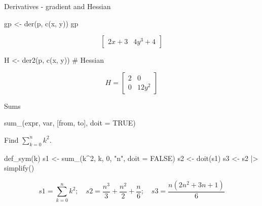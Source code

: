 \documentclass[
  ignorenonframetext,
]{beamer}
\newenvironment{Shaded}{\begin{snugshade}}{\end{snugshade}}
\newcommand{\AttributeTok}[1]{\textcolor[rgb]{0.40,0.45,0.13}{#1}}
\newcommand{\CommentTok}[1]{\textcolor[rgb]{0.37,0.37,0.37}{#1}}
\newcommand{\ConstantTok}[1]{\textcolor[rgb]{0.56,0.35,0.01}{#1}}
\newcommand{\DecValTok}[1]{\textcolor[rgb]{0.68,0.00,0.00}{#1}}
\newcommand{\FunctionTok}[1]{\textcolor[rgb]{0.28,0.35,0.67}{#1}}
\newcommand{\NormalTok}[1]{\textcolor[rgb]{0.00,0.23,0.31}{#1}}
\newcommand{\OtherTok}[1]{\textcolor[rgb]{0.00,0.23,0.31}{#1}}
\newcommand{\SpecialCharTok}[1]{\textcolor[rgb]{0.37,0.37,0.37}{#1}}
\newcommand{\StringTok}[1]{\textcolor[rgb]{0.13,0.47,0.30}{#1}}
\begin{document}
\begin{frame}[fragile]{Derivatives - gradient and Hessian}
\protect\hypertarget{derivatives---gradient-and-hessian}{}
\begin{Shaded}
\begin{Highlighting}[]
\NormalTok{gp }\OtherTok{\textless{}{-}} \FunctionTok{der}\NormalTok{(p, }\FunctionTok{c}\NormalTok{(x, y))}
\NormalTok{gp}
\end{Highlighting}
\end{Shaded}

\[\left[\begin{matrix}2 x + 3 & 4 y^{3} + 4\end{matrix}\right]\]

\begin{Shaded}
\begin{Highlighting}[]
\NormalTok{H }\OtherTok{\textless{}{-}} \FunctionTok{der2}\NormalTok{(p, }\FunctionTok{c}\NormalTok{(x, y)) }\CommentTok{\# Hessian}
\end{Highlighting}
\end{Shaded}

\[
H = \left[\begin{matrix}2 & 0\\0 & 12 y^{2}\end{matrix}\right]
\]
\end{frame}

\begin{frame}[fragile]{Sums}
\protect\hypertarget{sums}{}
\begin{Shaded}
\begin{Highlighting}[]
\FunctionTok{sum\_}\NormalTok{(expr, var, [from, to], }\AttributeTok{doit =} \ConstantTok{TRUE}\NormalTok{)}
\end{Highlighting}
\end{Shaded}

Find \(\sum_{k=0}^n k^2\).

\begin{Shaded}
\begin{Highlighting}[]
\FunctionTok{def\_sym}\NormalTok{(k)}
\NormalTok{s1 }\OtherTok{\textless{}{-}} \FunctionTok{sum\_}\NormalTok{(k}\SpecialCharTok{\^{}}\DecValTok{2}\NormalTok{, k, }\DecValTok{0}\NormalTok{, }\StringTok{"n"}\NormalTok{, }\AttributeTok{doit =} \ConstantTok{FALSE}\NormalTok{)}
\NormalTok{s2 }\OtherTok{\textless{}{-}} \FunctionTok{doit}\NormalTok{(s1)}
\NormalTok{s3 }\OtherTok{\textless{}{-}}\NormalTok{ s2 }\SpecialCharTok{|\textgreater{}} \FunctionTok{simplify}\NormalTok{()}
\end{Highlighting}
\end{Shaded}

\[
s1 = \sum_{k=0}^{n} k^{2}; \quad s2 = \frac{n^{3}}{3} + \frac{n^{2}}{2} + \frac{n}{6}; \quad s3 = \frac{n \left(2 n^{2} + 3 n + 1\right)}{6}
\]
\end{frame}
\end{document}
